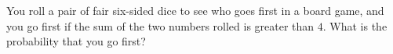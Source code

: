 You roll a pair of fair six-sided dice to see who goes first in a board game, and you go first if the sum of the two numbers rolled is greater than $4$. What is the probability that you go first?
